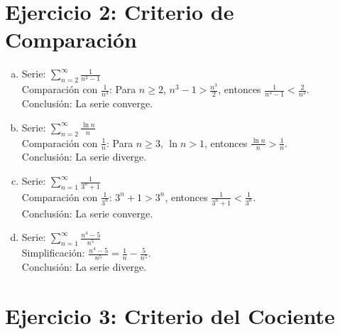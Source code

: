 \documentclass[12pt,a4paper]{article}
\begin{document}
\section*{Ejercicio 2: Criterio de Comparación}

\begin{enumerate}[a)]
    \item Serie: $\sum_{n=2}^{\infty} \frac{1}{n^3 - 1}$ \\
    Comparación con $\frac{1}{n^3}$: Para $n \geq 2$, $n^3 - 1 > \frac{n^3}{2}$, entonces $\frac{1}{n^3 - 1} < \frac{2}{n^3}$. \\
    Conclusión: La serie converge.

    \item Serie: $\sum_{n=2}^{\infty} \frac{\ln n}{n}$ \\
    Comparación con $\frac{1}{n}$: Para $n \geq 3$, $\ln n > 1$, entonces $\frac{\ln n}{n} > \frac{1}{n}$. \\
    Conclusión: La serie diverge.

    \item Serie: $\sum_{n=1}^{\infty} \frac{1}{3^n + 1}$ \\
    Comparación con $\frac{1}{3^n}$: $3^n + 1 > 3^n$, entonces $\frac{1}{3^n + 1} < \frac{1}{3^n}$. \\
    Conclusión: La serie converge.

    \item Serie: $\sum_{n=1}^{\infty} \frac{n^4 - 5}{n^5}$ \\
    Simplificación: $\frac{n^4 - 5}{n^5} = \frac{1}{n} - \frac{5}{n^5}$. \\
    Conclusión: La serie diverge.
\end{enumerate}

\section*{Ejercicio 3: Criterio del Cociente}
\end{document}
